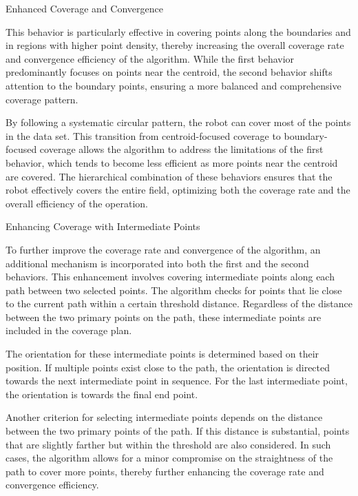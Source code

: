 \vspace*{6mm}   

Enhanced Coverage and Convergence

This behavior is particularly effective in covering points along the boundaries and in regions with higher point density, thereby increasing the overall coverage rate and convergence efficiency of the algorithm. While the first behavior predominantly focuses on points near the centroid, the second behavior shifts attention to the boundary points, ensuring a more balanced and comprehensive coverage pattern.

\vspace*{6mm}   

By following a systematic circular pattern, the robot can cover most of the points in the data set. This transition from centroid-focused coverage to boundary-focused coverage allows the algorithm to address the limitations of the first behavior, which tends to become less efficient as more points near the centroid are covered. The hierarchical combination of these behaviors ensures that the robot effectively covers the entire field, optimizing both the coverage rate and the overall efficiency of the operation.

\vspace*{6mm}   

Enhancing Coverage with Intermediate Points

To further improve the coverage rate and convergence of the algorithm, an additional mechanism is incorporated into both the first and the second behaviors. This enhancement involves covering intermediate points along each path between two selected points. The algorithm checks for points that lie close to the current path within a certain threshold distance. Regardless of the distance between the two primary points on the path, these intermediate points are included in the coverage plan.

\vspace*{6mm}   

The orientation for these intermediate points is determined based on their position. If multiple points exist close to the path, the orientation is directed towards the next intermediate point in sequence. For the last intermediate point, the orientation is towards the final end point.

\vspace*{6mm}   

Another criterion for selecting intermediate points depends on the distance between the two primary points of the path. If this distance is substantial, points that are slightly farther but within the threshold are also considered. In such cases, the algorithm allows for a minor compromise on the straightness of the path to cover more points, thereby further enhancing the coverage rate and convergence efficiency.


